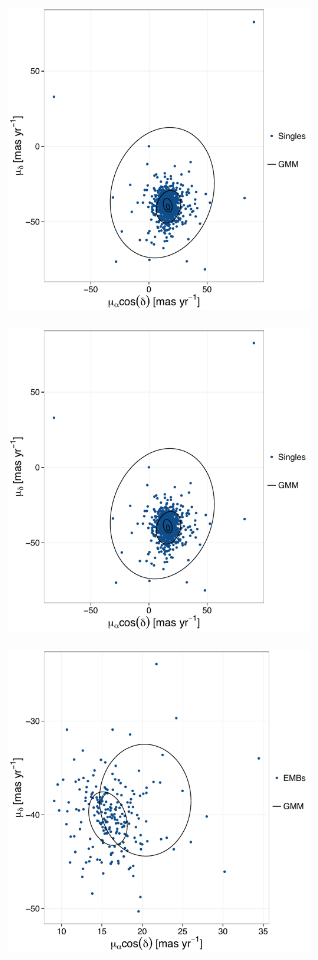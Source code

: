 \begin{figure}[ht!]
    \centering
    \begin{subfigure}[t]{0.48\textwidth}
        \includegraphics[page=2,height=8cm,width=\textwidth]{background/Figures/BIC_PM_Cs_fit.pdf}
        \caption{}
    \end{subfigure}
    \begin{subfigure}[t]{0.48\textwidth}
      \includegraphics[page=3,height=8cm,width=\textwidth]{background/Figures/BIC_PM_Cs_fit.pdf}
        \caption{}
    \end{subfigure}
     \begin{subfigure}[t]{0.48\textwidth}
      \includegraphics[page=2,height=8cm,width=\textwidth]{background/Figures/BIC_PM_Bs_fit.pdf}

\end{subfigure}
\end{figure}
